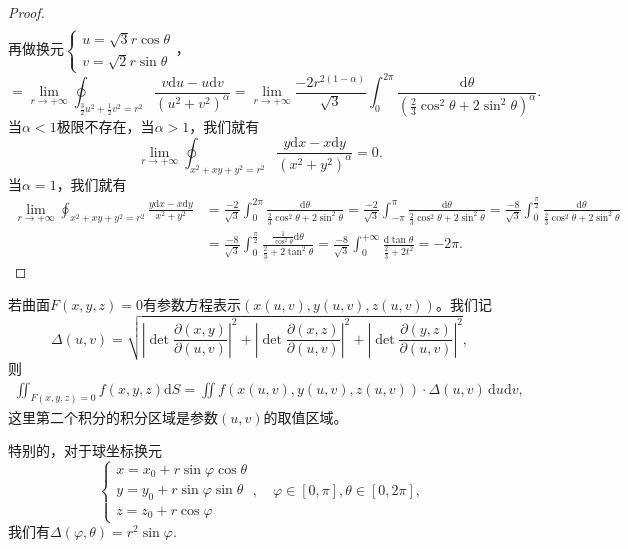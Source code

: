 \documentclass[../../main.tex]{subfiles}%
\begin{document}
\begin{proof}
\begin{align*}
\end{align*}
再做换元$\begin{cases}u=\sqrt3 r\cos\theta\\v=\sqrt2 r\sin\theta\end{cases}$，
\[
=\lim_{r\to+\infty}\oint_{\frac32u^2+\frac12v^2=r^2}\frac{v\mathrm{d}u-u\mathrm{d}v}{(u^2+v^2)^\alpha}
=\lim_{r\to+\infty}\frac{-2r^{2(1-\alpha)}}{\sqrt3}\int_{0}^{2\pi}\frac{\mathrm{d}\theta}{\left(\frac23\cos^2\theta+2\sin^2\theta\right)^\alpha}.
\]
当$\alpha<1$极限不存在，当$\alpha>1$，我们就有
\[
\lim_{r\to+\infty}\oint_{x^2+xy+y^2=r^2}\frac{y\mathrm{d}x-x\mathrm{d}y}{(x^2+y^2)^\alpha}=0.
\]
当$\alpha=1$，我们就有
\begin{align*}
\lim_{r\to+\infty}\oint_{x^2+xy+y^2=r^2}\frac{y\mathrm{d}x-x\mathrm{d}y}{x^2+y^2}
&=\frac{-2}{\sqrt3}\int_{0}^{2\pi}\frac{\mathrm{d}\theta}{\frac23\cos^2\theta+2\sin^2\theta}
=\frac{-2}{\sqrt3}\int_{-\pi}^{\pi}\frac{\mathrm{d}\theta}{\frac23\cos^2\theta+2\sin^2\theta}
=\frac{-8}{\sqrt3}\int_{0}^{\frac{\pi}{2}}\frac{\mathrm{d}\theta}{\frac23\cos^2\theta+2\sin^2\theta}\\
&=\frac{-8}{\sqrt3}\int_{0}^{\frac{\pi}{2}}\frac{\frac1{\cos^2\theta}\mathrm{d}\theta}{\frac23+2\tan^2\theta}
=\frac{-8}{\sqrt3}\int_{0}^{+\infty}\frac{\mathrm{d}\tan\theta}{\frac23+2t^2}
=-2\pi.
\end{align*}\end{proof}

\begin{theorem}[第一类曲面积分的参数方程法]\label{theorem:第一类曲面积分的参数方程法}
若曲面$F(x,y,z)=0$有参数方程表示$(x(u,v),y(u,v),z(u,v))$。我们记
\[
\Delta(u,v)=\sqrt{\left|\det \frac{\partial(x,y)}{\partial(u,v)}\right|^2+\left|\det \frac{\partial(x,z)}{\partial(u,v)}\right|^2+\left|\det \frac{\partial(y,z)}{\partial(u,v)}\right|^2},
\]
则
\begin{align*}
\iint_{F(x,y,z)=0} f(x,y,z)\mathrm{d}S=\iint f(x(u,v),y(u,v),z(u,v))\cdot \Delta(u,v)\,\mathrm{d}u\mathrm{d}v,
\end{align*}
这里第二个积分的积分区域是参数$(u,v)$的取值区域。
\end{theorem}
\begin{remark}
特别的，对于球坐标换元
\[
\begin{cases}
x=x_0+r\sin\varphi\cos\theta\\
y=y_0+r\sin\varphi\sin\theta\\
z=z_0+r\cos\varphi
\end{cases},\quad \varphi\in[0,\pi],\theta\in[0,2\pi],
\]
我们有$\Delta(\varphi,\theta)=r^2\sin\varphi$.
\end{remark}
\end{document}
